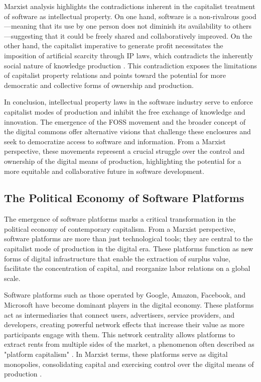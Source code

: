 \begin{refsection}
Marxist analysis highlights the contradictions inherent in the capitalist treatment of software as intellectual property. On one hand, software is a non-rivalrous good—meaning that its use by one person does not diminish its availability to others—suggesting that it could be freely shared and collaboratively improved. On the other hand, the capitalist imperative to generate profit necessitates the imposition of artificial scarcity through IP laws, which contradicts the inherently social nature of knowledge production \cite[pp.~82-85]{fuchs2014digital}. This contradiction exposes the limitations of capitalist property relations and points toward the potential for more democratic and collective forms of ownership and production.

In conclusion, intellectual property laws in the software industry serve to enforce capitalist modes of production and inhibit the free exchange of knowledge and innovation. The emergence of the FOSS movement and the broader concept of the digital commons offer alternative visions that challenge these enclosures and seek to democratize access to software and information. From a Marxist perspective, these movements represent a crucial struggle over the control and ownership of the digital means of production, highlighting the potential for a more equitable and collaborative future in software development.

\subsection{The Political Economy of Software Platforms}

The emergence of software platforms marks a critical transformation in the political economy of contemporary capitalism. From a Marxist perspective, software platforms are more than just technological tools; they are central to the capitalist mode of production in the digital era. These platforms function as new forms of digital infrastructure that enable the extraction of surplus value, facilitate the concentration of capital, and reorganize labor relations on a global scale.

Software platforms such as those operated by Google, Amazon, Facebook, and Microsoft have become dominant players in the digital economy. These platforms act as intermediaries that connect users, advertisers, service providers, and developers, creating powerful network effects that increase their value as more participants engage with them. This network centrality allows platforms to extract rents from multiple sides of the market, a phenomenon often described as "platform capitalism" \cite[pp.~39-41]{srnicek2017platform}. In Marxist terms, these platforms serve as digital monopolies, consolidating capital and exercising control over the digital means of production \cite[pp.~297-300]{marx2008capital}.


\end{refsection}
